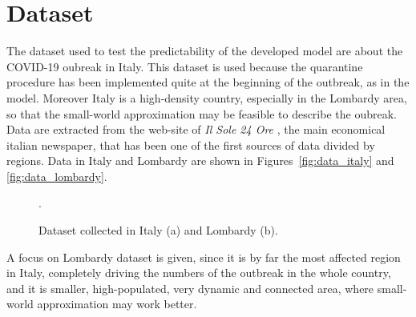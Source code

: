 \section{Dataset}

The dataset used to test the predictability of the developed model are about the COVID-19 oubreak in Italy. This dataset is used because the quarantine procedure has been implemented quite at the beginning of the outbreak, as in the model. Moreover Italy is a high-density country, especially in the Lombardy area, so that the small-world approximation may be feasible to describe the oubreak. Data are extracted from the web-site of \emph{Il Sole 24 Ore} \cite{Lab24}, the main economical italian newspaper, that has been one of the first sources of data divided by regions. Data in Italy and Lombardy are shown in Figures~\ref{fig:data_italy} and \ref{fig:data_lombardy}.\\

\begin{figure}[!ht]\centering
{}

\caption{Dataset collected in Italy (a) and Lombardy (b).}.
\end{figure}

A focus on Lombardy dataset is given, since it is by far the most affected region in Italy, completely driving the numbers of the outbreak in the whole country, and it is smaller, high-populated, very dynamic and connected area, where small-world approximation may work better.